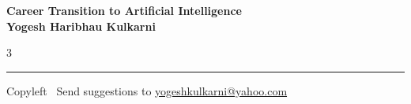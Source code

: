 \documentclass[8pt,landscape]{article}
\begin{document}
\footnotesize


\begin{center}
\Large{\textbf{Career Transition to Artificial Intelligence\\ Yogesh Haribhau Kulkarni}}  
\end{center}

\begin{multicols}{3}


\end{multicols}

\rule{\linewidth}{0.25pt}
\scriptsize
Copyleft \textcopyleft\  Send suggestions to 
\href{http://www.yogeshkulkarni.com}{yogeshkulkarni@yahoo.com}
\end{document}
